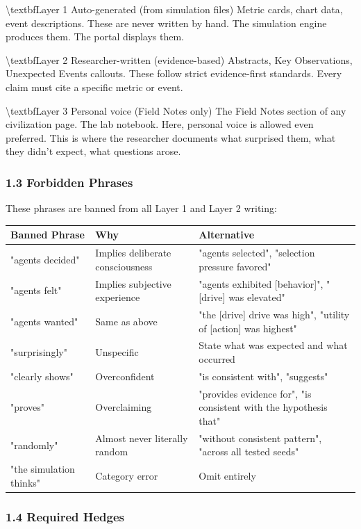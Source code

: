 \documentclass[11pt,a4paper]{article}
\begin{document}
\textbackslash{}textbf{Layer 1  Auto-generated (from simulation files)}
Metric cards, chart data, event descriptions. These are never written by hand. The simulation engine produces them. The portal displays them.

\textbackslash{}textbf{Layer 2  Researcher-written (evidence-based)}
Abstracts, Key Observations, Unexpected Events callouts. These follow strict evidence-first standards. Every claim must cite a specific metric or event.

\textbackslash{}textbf{Layer 3  Personal voice (Field Notes only)}
The Field Notes section of any civilization page. The lab notebook. Here, personal voice is allowed  even preferred. This is where the researcher documents what surprised them, what they didn't expect, what questions arose.

\subsubsection*{1.3 Forbidden Phrases}

These phrases are banned from all Layer 1 and Layer 2 writing:

\begin{longtable}{lll}
\toprule
Banned Phrase & Why & Alternative \\
\midrule
\endhead
"agents decided" & Implies deliberate consciousness & "agents selected", "selection pressure favored" \\
"agents felt" & Implies subjective experience & "agents exhibited [behavior]", "[drive] was elevated" \\
"agents wanted" & Same as above & "the [drive] drive was high", "utility of [action] was highest" \\
"surprisingly" & Unspecific & State what was expected and what occurred \\
"clearly shows" & Overconfident & "is consistent with", "suggests" \\
"proves" & Overclaiming & "provides evidence for", "is consistent with the hypothesis that" \\
"randomly" & Almost never literally random & "without consistent pattern", "across all tested seeds" \\
"the simulation thinks" & Category error & Omit entirely \\
\bottomrule
\end{longtable}

\subsubsection*{1.4 Required Hedges}
\end{document}

